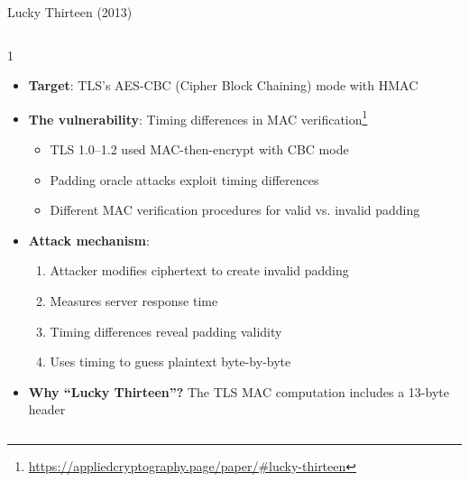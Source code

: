 \ifdefined\PRESENTATION\else\PassOptionsToClass{handout}{beamer}\fi\documentclass[aspectratio=169, lualatex]{beamer}
\begin{document}
\begin{frame}{Lucky Thirteen (2013)}
	\begin{columns}[c]
		\begin{column}{1\textwidth}
			\begin{itemize}
				\item \textbf{Target}: TLS's AES-CBC (Cipher Block Chaining) mode with HMAC
				\item \textbf{The vulnerability}: Timing differences in MAC verification\footnote{\url{https://appliedcryptography.page/paper/\#lucky-thirteen}}
				      \begin{itemize}
					      \item TLS 1.0--1.2 used MAC-then-encrypt with CBC mode
					      \item Padding oracle attacks exploit timing differences
					      \item Different MAC verification procedures for valid vs. invalid padding
				      \end{itemize}
				\item \textbf{Attack mechanism}:
				      \begin{enumerate}
					      \item Attacker modifies ciphertext to create invalid padding
					      \item Measures server response time
					      \item Timing differences reveal padding validity
					      \item Uses timing to guess plaintext byte-by-byte
				      \end{enumerate}
				\item \textbf{Why ``Lucky Thirteen''?} The TLS MAC computation includes a 13-byte header
			\end{itemize}
		\end{column}
	\end{columns}
\end{frame}
\end{document}
